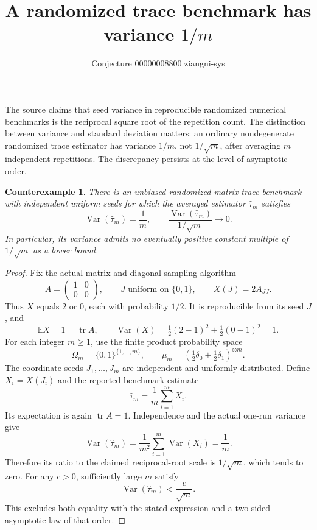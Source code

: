 \documentclass[11pt]{article}
\title{A randomized trace benchmark has variance $1/m$}
\author{Conjecture 00000008800 \quad ziangni-sys}
\date{}
\newtheorem*{proposition}{Counterexample}
\begin{document}
\maketitle
The source claims that seed variance in reproducible randomized numerical benchmarks is the reciprocal square root of the repetition count. The distinction between variance and standard deviation matters: an ordinary nondegenerate randomized trace estimator has variance $1/m$, not $1/\sqrt m$, after averaging $m$ independent repetitions. The discrepancy persists at the level of asymptotic order.

\begin{proposition}
There is an unbiased randomized matrix-trace benchmark with independent uniform seeds for which the averaged estimator $\widehat\tau_m$ satisfies
\[
 \operatorname{Var}(\widehat\tau_m)=\frac1m,\qquad
 \frac{\operatorname{Var}(\widehat\tau_m)}{1/\sqrt m}\longrightarrow0.
\]
In particular, its variance admits no eventually positive constant multiple of $1/\sqrt m$ as a lower bound.
\end{proposition}
\begin{proof}
Fix the actual matrix and diagonal-sampling algorithm
\[
 A=\begin{pmatrix}1&0\\0&0\end{pmatrix},\qquad
 J\text{ uniform on }\{0,1\},\qquad X(J)=2A_{JJ}.
\]
Thus $X$ equals $2$ or $0$, each with probability $1/2$. It is reproducible from its seed $J$, and
\[
 \mathbb E X=1=\operatorname{tr}A,\qquad
 \operatorname{Var}(X)=\tfrac12(2-1)^2+\tfrac12(0-1)^2=1.
\]
For each integer $m\geq1$, use the finite product probability space
\[
 \Omega_m=\{0,1\}^{\{1,\ldots,m\}},\qquad
 \mu_m=\left(\tfrac12\delta_0+\tfrac12\delta_1\right)^{\otimes m}.
\]
The coordinate seeds $J_1,\ldots,J_m$ are independent and uniformly distributed. Define $X_i=X(J_i)$ and the reported benchmark estimate
\[
 \widehat\tau_m=\frac1m\sum_{i=1}^m X_i.
\]
Its expectation is again $\operatorname{tr}A=1$. Independence and the actual one-run variance give
\[
 \operatorname{Var}(\widehat\tau_m)
 =\frac1{m^2}\sum_{i=1}^m\operatorname{Var}(X_i)
 =\frac1m.
\]
Therefore its ratio to the claimed reciprocal-root scale is $1/\sqrt m$, which tends to zero. For any $c>0$, sufficiently large $m$ satisfy
\[
 \operatorname{Var}(\widehat\tau_m)<\frac{c}{\sqrt m}.
\]
This excludes both equality with the stated expression and a two-sided asymptotic law of that order.
\end{proof}
\end{document}
